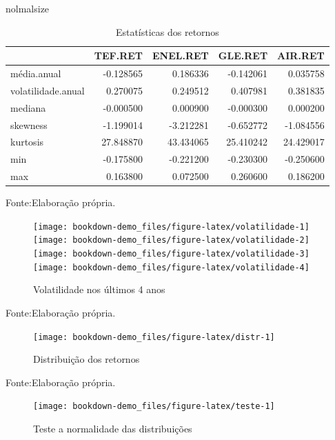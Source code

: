 \documentclass[
  12pt,
  a4paper,
  openany]{book}
\begin{document}
nolmalsize

\begin{table}[!h]

\caption{\label{tab:unnamed-chunk-12}Estatísticas dos retornos}
\centering
\begin{tabular}[t]{lrrrr}
\toprule
  & TEF.RET & ENEL.RET & GLE.RET & AIR.RET\\
\midrule
média.anual & -0.128565 & 0.186336 & -0.142061 & 0.035758\\
volatilidade.anual & 0.270075 & 0.249512 & 0.407981 & 0.381835\\
mediana & -0.000500 & 0.000900 & -0.000300 & 0.000200\\
skewness & -1.199014 & -3.212281 & -0.652772 & -1.084556\\
kurtosis & 27.848870 & 43.434065 & 25.410242 & 24.429017\\
\addlinespace
min & -0.175800 & -0.221200 & -0.230300 & -0.250600\\
max & 0.163800 & 0.072500 & 0.260600 & 0.186200\\
\bottomrule
\end{tabular}
\end{table}
\FloatBarrier
\centering

Fonte:Elaboração própria.

\justifying
\bigskip
\begin{figure}

{\centering \texttt{[image: bookdown-demo\_files/figure-latex/volatilidade-1]} \texttt{[image: bookdown-demo\_files/figure-latex/volatilidade-2]} \texttt{[image: bookdown-demo\_files/figure-latex/volatilidade-3]} \texttt{[image: bookdown-demo\_files/figure-latex/volatilidade-4]} 

}

\caption{Volatilidade nos últimos 4 anos}\label{fig:volatilidade}
\end{figure}
\FloatBarrier
\centering

Fonte:Elaboração própria.

\justifying
\bigskip
\begin{figure}

{\centering \texttt{[image: bookdown-demo\_files/figure-latex/distr-1]} 

}

\caption{Distribuição dos retornos}\label{fig:distr}
\end{figure}
\FloatBarrier
\centering

Fonte:Elaboração própria.

\justifying
\bigskip
\begin{figure}

{\centering \texttt{[image: bookdown-demo\_files/figure-latex/teste-1]} 

}

\caption{Teste a normalidade das distribuições}\label{fig:teste}
\end{figure}
\FloatBarrier
\centering
\end{document}
